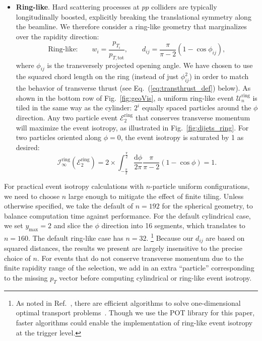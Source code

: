 \documentclass[letterpaper,11pt]{article}
\newcommand{\iso}[2]{\mathcal{I}^\text{#1}_{#2}}
\DeclareRobustCommand{\Fig}[1]{Fig.~\ref{#1}}
\DeclareRobustCommand{\Eq}[1]{Eq.~(\ref{#1})}
\DeclareRobustCommand{\Ref}[1]{Ref.~\cite{#1}}
\begin{document}
\begin{itemize}
\item \textbf{Ring-like}.   Hard scattering processes at $pp$ colliders are typically longitudinally boosted, explicitly breaking the translational symmetry along the beamline.
%
We therefore consider a ring-like geometry that marginalizes over the rapidity direction: 
%
\begin{equation}
\label{eq:ring_metric}
\boxed{\text{Ring-like:}} \qquad  w_i = \frac{p_{T_i}}{p_{T, \text{tot}}}, \qquad d_{ij} = \frac{\pi}{\pi -2} \left( 1 - \cos \phi_{ij}\right),
\end{equation}
%
where $\phi_{ij}$ is the transversely projected opening angle.
%
We have chosen to use the squared chord length on the ring (instead of just $\phi_{ij}^2$) in order to match the behavior of transverse thrust \cite{Bertram:2002sv,Nagy:2003tz,Banfi:2004nk,Banfi:2010xy} (see \Eq{eq:transthrust_def} below).
%
As shown in the bottom row of \Fig{fig:geoVis}, a uniform ring-like event $\mathcal{U}_n^\text{ring}$ is tiled in the same way as the cylinder: $2^i$ equally spaced particles around the $\phi$ direction. 
%
Any two particle event $\mathcal{E}^\text{ring}_2$ that conserves transverse momentum will maximize the event isotropy, as illustrated in \Fig{fig:dijets_ring}. 
%
For two particles oriented along $\phi = 0$, the event isotropy is saturated by 1 as desired:
%
\begin{equation}
\iso{ring}{\infty}( \mathcal{E}^\text{ring}_2)= 2 \times \int_{-\frac{\pi}{2}}^{\frac{\pi}{2}} \frac{\text{d} \phi}{2\pi} \frac{\pi}{\pi-2} \left( 1 - \cos \phi \right) = 1.
\end{equation}

\end{itemize}


For practical event isotropy calculations with $n$-particle uniform configurations, we need to choose $n$ large enough to mitigate the effect of finite tiling.
%
Unless otherwise specified, we take the default of $n=192$ for the spherical geometry, to balance computation time against performance. 
%
For the default cylindrical case, we set $y_\text{max} = 2$ and slice the $\phi$ direction into 16 segments, which translates to $n=160$.
%
The default ring-like case has $n=32$.%
%
\footnote{As noted in \Ref{Komiske:2020qhg}, there are efficient algorithms to solve one-dimensional optimal transport problems~\cite{Rabin:2011jd}.
%
Though we use the POT library for this paper, faster algorithms could enable the implementation of ring-like event isotropy at the trigger level.}
%
Because our $d_{ij}$ are based on squared distances, the results we present are largely insensitive to the precise choice of $n$.
%
For events that do not conserve transverse momentum due to the finite rapidity range of the selection, we add in an extra ``particle'' corresponding to the missing $p_T$ vector before computing cylindrical or ring-like event isotropy.
\end{document}
